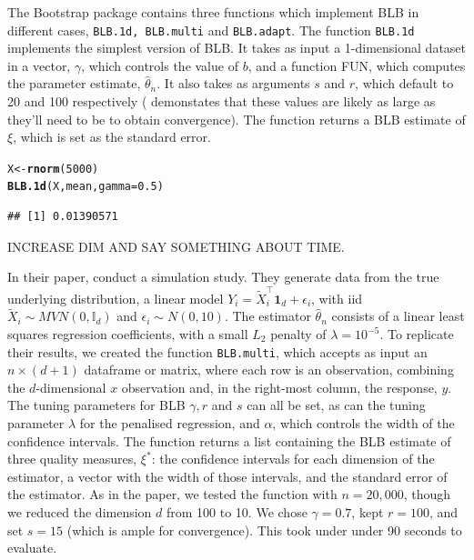 \documentclass{article}\usepackage[]{graphicx}\usepackage[]{color}
\makeatletter
\newcommand{\hlnum}[1]{\textcolor[rgb]{0.686,0.059,0.569}{#1}}%
\newcommand{\hlstd}[1]{\textcolor[rgb]{0.345,0.345,0.345}{#1}}%
\newcommand{\hlkwb}[1]{\textcolor[rgb]{0.69,0.353,0.396}{#1}}%
\newcommand{\hlkwc}[1]{\textcolor[rgb]{0.333,0.667,0.333}{#1}}%
\newcommand{\hlkwd}[1]{\textcolor[rgb]{0.737,0.353,0.396}{\textbf{#1}}}%
\newenvironment{kframe}{%
 \def\at@end@of@kframe{}%
 \ifinner\ifhmode%
  \def\at@end@of@kframe{\end{minipage}}%
  \begin{minipage}{\columnwidth}%
 \fi\fi%
 \def\FrameCommand##1{\hskip\@totalleftmargin \hskip-\fboxsep
 \colorbox{shadecolor}{##1}\hskip-\fboxsep
     \hskip-\linewidth \hskip-\@totalleftmargin \hskip\columnwidth}%
 \MakeFramed {\advance\hsize-\width
   \@totalleftmargin\z@ \linewidth\hsize
   \@setminipage}}%
 {\par\unskip\endMakeFramed%
 \at@end@of@kframe}
\newenvironment{knitrout}{}{} %
\makeatother
\begin{document}
The Bootstrap package contains three functions which implement BLB in different cases, \texttt{BLB.1d, BLB.multi} and \texttt{BLB.adapt}. The function \texttt{BLB.1d} implements the simplest version of BLB. It takes as input a 1-dimensional dataset in a vector, $\gamma$, which controls the value of $b$, and a function FUN, which computes the parameter estimate, $\hat\theta_n$. It also takes as arguments $s$ and $r$, which default to 20 and 100 respectively (\textcite{Kleiner2014} demonstates that these values are likely as large as they'll need to be to obtain convergence). The function returns a BLB estimate of $\xi$, which is set as the standard error.

\begin{knitrout}
\color{fgcolor}\begin{kframe}
\begin{alltt}
\hlstd{X} \hlkwb{<-} \hlkwd{rnorm}\hlstd{(}\hlnum{5000}\hlstd{)}
\hlkwd{BLB.1d}\hlstd{(X, mean,} \hlkwc{gamma}\hlstd{=}\hlnum{0.5}\hlstd{)}
\end{alltt}
\begin{verbatim}
## [1] 0.01390571
\end{verbatim}
\end{kframe}
\end{knitrout}
INCREASE DIM AND SAY SOMETHING ABOUT TIME.

In their paper, \textcite{Kleiner2014} conduct a simulation study. They generate data from the true underlying distribution, a linear model $Y_i = \tilde X_i^{\top}\textbf{1}_d + \epsilon_i$, with iid $\tilde X_i \sim MVN(0,\mathbb{I}_d)$ and $\epsilon_i \sim N(0,10)$. The estimator $\hat\theta_n$ consists of a linear least squares regression coefficients, with a small $L_2$ penalty of $\lambda=10^{-5}$. To replicate their results, we created the function \texttt{BLB.multi}, which accepts as input an $n \times (d+1)$ dataframe or matrix, where each row is an observation, combining the $d$-dimensional $x$ observation and, in the right-most column, the response, $y$. The tuning parameters for BLB $\gamma, r$ and $s$ can all be set, as can the tuning parameter $\lambda$ for the penalised regression, and $\alpha$, which controls the width of the confidence intervals. The function returns a list containing the BLB estimate of three quality measures, $\xi^*$: the confidence intervals for each dimension of the estimator, a vector with the width of those intervals, and the standard error of the estimator. As in the paper, we tested the function with $n=20,000$, though we reduced the dimension $d$ from 100 to 10. We chose $\gamma=0.7$, kept $r=100$, and set $s=15$ (which is ample for convergence). This took under under 90 seconds to evaluate.
\end{document}

